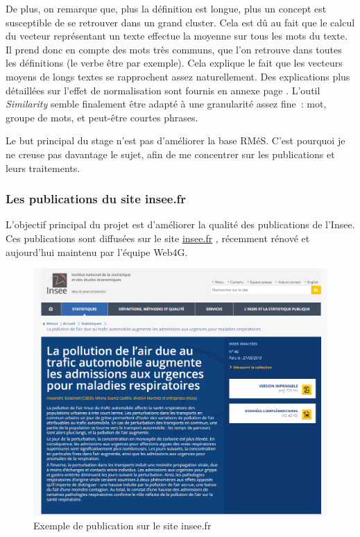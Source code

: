 De plus, on remarque que, plus la définition est longue, plus un concept est susceptible de se retrouver dans un grand cluster. Cela est dû au fait que le calcul du vecteur représentant un texte effectue la moyenne sur tous les mots du texte. Il prend donc en compte des mots très communs, que l'on retrouve dans toutes les définitions (le verbe être par exemple). Cela explique le fait que les vecteurs moyens de longs textes se rapprochent assez naturellement. Des explications plus détaillées sur l'effet de normalisation sont fournis en annexe page \pageref{hierarchisation}. L'outil \textit{Similarity} semble finalement être adapté à une granularité assez fine~: mot, groupe de mots, et peut-être courtes phrases.
\newline

Le but principal du stage n'est pas d'améliorer la base RMéS. C'est pourquoi je ne creuse pas davantage le sujet, afin de me concentrer sur les publications et leurs traitements.
\label{section 1.2.1 - Premières tentatives}

\subsubsection{Les publications du site insee.fr}

L'objectif principal du projet est d'améliorer la qualité des publications de l'Insee. Ces publications sont diffusées sur le site \href{https://insee.fr/fr/accueil}{insee.fr} \cite{insee.fr}, récemment rénové et aujourd'hui maintenu par l'équipe Web4G.
\newline

\begin{figure}[H]
    \centering
    \includegraphics[scale=0.52]{images/insee-fr-exemple.png}
    \caption{Exemple de publication sur le site insee.fr}
    \label{fig:insee.fr}
\end{figure}

